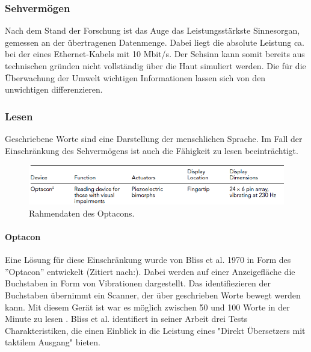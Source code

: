 \documentclass{llncs}					%
\begin{document}
\subsubsection{Sehvermögen}
Nach dem Stand der Forschung ist das Auge das Leistungsstärkste Sinnesorgan, gemessen an der übertragenen Datenmenge\cite{Koch2006}. Dabei liegt die absolute Leistung ca. bei der eines Ethernet-Kabels mit 10 Mbit/s\cite{Koch2006}. Der Sehsinn kann somit bereits aus technischen gründen nicht vollständig über die Haut simuliert werden.
Die für die Überwachung der Umwelt wichtigen Informationen lassen sich von den unwichtigen differenzieren.

\subsubsection{Lesen} Geschriebene Worte sind eine Darstellung der menschlichen Sprache. Im Fall der Einschränkung des Sehvermögens ist auch die Fähigkeit zu lesen beeinträchtigt.

\begin{figure}[htbp]
	\begin{center}
		\includegraphics[width = 12cm]{Grafiken/4-Optacon-Data.png}
		\caption{Rahmendaten des Optacons.\cite{doi:10.1518/001872008X250638}}
		\label{4-Optacon-Data}
	\end{center}
\end{figure}

\paragraph{Optacon} Eine Lösung für diese Einschränkung wurde von Bliss et al. 1970 in Form des ''Optacon'' entwickelt (Zitiert nach:\cite{doi:10.1518/001872008X250638}). Dabei werden auf einer Anzeigefläche die Buchstaben in Form von Vibrationen dargestellt. Das identifiezieren der Buchstaben übernimmt ein Scanner, der über geschrieben Worte bewegt werden kann. Mit diesem Gerät ist war es möglich zwischen 50 und 100 Worte in der Minute zu lesen \cite{doi:10.1518/001872008X250638}.
Bliss et al. \cite{4081931} identifiert in seiner Arbeit drei Tests Charakteristiken, die einen Einblick in die Leistung eines "Direkt Übersetzers mit taktilem Ausgang" \cite{4081931} bieten.
\end{document}
